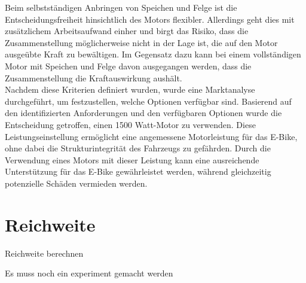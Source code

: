 Beim selbstständigen Anbringen von Speichen und Felge ist die Entscheidungsfreiheit hinsichtlich des Motors flexibler. Allerdings geht dies mit zusätzlichem Arbeitsaufwand einher und birgt das Risiko, dass die Zusammenstellung möglicherweise nicht in der Lage ist, die auf den Motor ausgeübte Kraft zu bewältigen. Im Gegensatz dazu kann bei einem vollständigen Motor mit Speichen und Felge davon ausgegangen werden, dass die Zusammenstellung die Kraftauswirkung aushält.\\

Nachdem diese Kriterien definiert wurden, wurde eine Marktanalyse durchgeführt, um festzustellen, welche Optionen verfügbar sind. Basierend auf den identifizierten Anforderungen und den verfügbaren Optionen wurde die Entscheidung getroffen, einen 1500 Watt-Motor zu verwenden. Diese Leistungseinstellung ermöglicht eine angemessene Motorleistung für das E-Bike, ohne dabei die Strukturintegrität des Fahrzeugs zu gefährden. Durch die Verwendung eines Motors mit dieser Leistung kann eine ausreichende Unterstützung für das E-Bike gewährleistet werden, während gleichzeitig potenzielle Schäden vermieden werden.\\


\section{Reichweite}
Reichweite berechnen

Es muss noch ein experiment gemacht werden 




